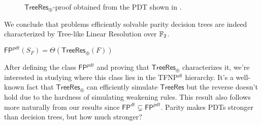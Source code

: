 \begin{figure}[H]
    \centering
    

    \caption{$\mathsf{TreeRes}_\oplus$-proof obtained from the PDT shown in .}
\end{figure}

We conclude that problems efficiently solvable parity decision trees are indeed characterized by Tree-like Linear Resolution over $\mathbb{F}_2$.

\begin{theorem}
    $\mathsf{FP}^{pdt}(S_F) = \Theta(\mathsf{TreeRes}_\oplus(F))$
\end{theorem}

After defining the class $\mathsf{FP}^{pdt}$ and proving that $\mathsf{TreeRes}_\oplus$ characterizes it, we're interested in studying where this class lies in the \textsf{TFNP}$^{dt}$ hierarchy. It's a well-known fact that $\mathsf{TreeRes}_\oplus$ can efficiently simulate $\mathsf{TreeRes}$ but the reverse doesn't hold due to the hardness of simulating weakening rules. This result also follows more naturally from our results since $\mathsf{FP}^{dt} \subsetneq \mathsf{FP}^{pdt}$. Parity makes PDTs stronger than decision trees, but how much stronger?

